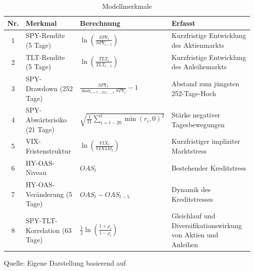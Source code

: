 \begin{table}[H]
    \setlength{\arrayrulewidth}{1pt}
    \renewcommand{\arraystretch}{1.35}
    \begin{threeparttable}
        \caption{Modellmerkmale}
        \label{tab:modellmerkmale}

        \small

        \begin{tabularx}{\textwidth}{
            |c|
            >{\raggedright\arraybackslash}p{3.4cm}|
            >{\centering\arraybackslash}p{4.7cm}|
            >{\raggedright\arraybackslash}X|
        }
            \hline
            \textbf{Nr.} &
            \textbf{Merkmal} &
            \textbf{Berechnung} &
            \textbf{Erfasst}
            \tabularnewline \hline

            1 &
            SPY-Rendite (5 Tage) &
            $\ln\left(\frac{SPY_t}{SPY_{t-5}}\right)$ &
            Kurzfristige Entwicklung des Aktienmarkts
            \tabularnewline \hline

            2 &
            TLT-Rendite (5 Tage) &
            $\ln\left(\frac{TLT_t}{TLT_{t-5}}\right)$ &
            Kurzfristige Entwicklung des Anleihemarkts
            \tabularnewline \hline

            3 &
            SPY-Drawdown (252 Tage) &
            $\frac{SPY_t}{\max_{i=t-251,\ldots,t}SPY_i}-1$ &
            Abstand zum jüngsten 252-Tage-Hoch
            \tabularnewline \hline

            4 &
            SPY-Abwärtsrisiko (21 Tage) &
            $\sqrt{\frac{1}{21}\sum_{i=t-20}^{t}\min(r_i,0)^2}$ &
            Stärke negativer Tagesbewegungen
            \tabularnewline \hline

            5 &
            VIX-Fristenstruktur &
            $\ln\left(\frac{VIX_t}{VIX3M_t}\right)$ &
            Kurzfristiger impliziter Marktstress
            \tabularnewline \hline

            6 &
            HY-OAS-Niveau &
            $OAS_t$ &
            Bestehender Kreditstress
            \tabularnewline \hline

            7 &
            HY-OAS-Veränderung (5 Tage) &
            $OAS_t-OAS_{t-5}$ &
            Dynamik des Kreditstresses
            \tabularnewline \hline

            8 &
            SPY-TLT-Korrelation (63 Tage) &
            $\frac{1}{2}\ln\left(\frac{1+\rho_t}{1-\rho_t}\right)$ &
            Gleichlauf und Diversifikationswirkung von Aktien und Anleihen
            \tabularnewline \hline
        \end{tabularx}
        \begin{tablenotes}[flushleft]
            \item \normalsize{Quelle: Eigene Darstellung basierend auf \cite{page_when_2018, cont_empirical_2001, polavarapu_cross-asset_2026, chekhlov_drawdown_2005, johnson_risk_2015, yang_information_leakage_2024, barndorff-nielsen_measuring_2008, bazan-palomino_volatility_2026}}
        \end{tablenotes}
    \end{threeparttable}
\end{table}

